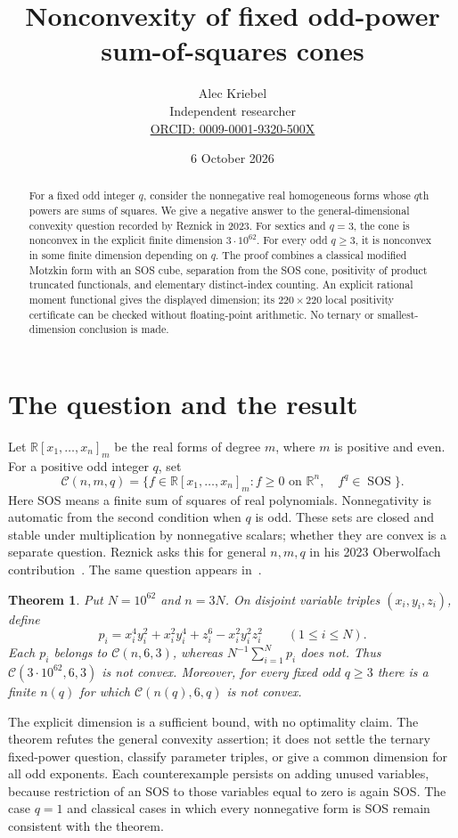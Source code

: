 \documentclass[11pt]{article}
\title{Nonconvexity of fixed odd-power sum-of-squares cones}
\author{Alec Kriebel\\\small Independent researcher\\
\small\href{https://orcid.org/0009-0001-9320-500X}{ORCID: 0009-0001-9320-500X}}
\date{6 October 2026}
\newtheorem{theorem}{Theorem}
\newcommand{\R}{\mathbb R}
\newcommand{\SOS}{\operatorname{SOS}}
\newcommand{\C}{\mathcal C}
\begin{document}
\maketitle
\begin{abstract}
For a fixed odd integer $q$, consider the nonnegative real homogeneous
forms whose $q$th powers are sums of squares. We give a negative answer to
the general-dimensional convexity question recorded by Reznick in 2023.
For sextics and $q=3$, the cone is nonconvex in the explicit finite dimension
$3\cdot10^{62}$. For every odd $q\ge3$, it is nonconvex in some finite
dimension depending on $q$. The proof combines a classical modified
Motzkin form with an SOS cube, separation from the SOS cone, positivity of
product truncated functionals, and elementary distinct-index counting.
An explicit rational moment functional gives the displayed dimension;
its $220\times220$ local positivity certificate can be checked without
floating-point arithmetic. No ternary or smallest-dimension conclusion is made.
\end{abstract}

\section{The question and the result}
Let $\R[x_1,\ldots,x_n]_m$ be the real forms of degree $m$, where $m$ is
positive and even. For a positive odd integer $q$, set
\[
 \C(n,m,q)=\{f\in\R[x_1,\ldots,x_n]_m:
                  f\ge0\text{ on }\R^n,\quad f^q\in\SOS\}.
\]
Here SOS means a finite sum of squares of real polynomials. Nonnegativity
is automatic from the second condition when $q$ is odd. These sets are
closed and stable under multiplication by nonnegative scalars; whether
they are convex is a separate question. Reznick asks this for general $n,m,q$
in his 2023 Oberwolfach contribution~\cite[p.779]{OWR}. The same question
appears in~\cite[\S6]{BKR}.

\begin{theorem}\label{thm:main}
Put $N=10^{62}$ and $n=3N$. On disjoint variable triples $(x_i,y_i,z_i)$,
define
\[
 p_i=x_i^4y_i^2+x_i^2y_i^4+z_i^6-x_i^2y_i^2z_i^2\qquad(1\le i\le N).
\]
Each $p_i$ belongs to $\C(n,6,3)$, whereas
$N^{-1}\sum_{i=1}^N p_i$ does not. Thus $\C(3\cdot10^{62},6,3)$ is not convex.
Moreover, for every fixed odd $q\ge3$ there is a finite $n(q)$ for which
$\C(n(q),6,q)$ is not convex.
\end{theorem}

The explicit dimension is a sufficient bound, with no optimality claim.
The theorem refutes the general convexity assertion; it does not settle
the ternary fixed-power question, classify parameter triples, or give a
common dimension for all odd exponents. Each counterexample persists on
adding unused variables, because restriction of an SOS to those variables
equal to zero is again SOS. The case $q=1$ and classical cases in which
every nonnegative form is SOS remain consistent with the theorem.
\end{document}
